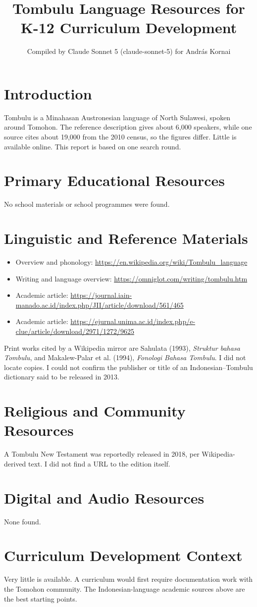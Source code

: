 \documentclass[12pt]{article}
\title{Tombulu Language Resources for K-12 Curriculum Development}
\author{Compiled by Claude Sonnet 5 (claude-sonnet-5) for Andr\'as Kornai}
\date{}
\begin{document}
\maketitle

\section{Introduction}
Tombulu is a Minahasan Austronesian language of North Sulawesi, spoken around Tomohon. The reference description gives about 6,000 speakers, while one source cites about 19,000 from the 2010 census, so the figures differ. Little is available online. This report is based on one search round.

\section{Primary Educational Resources}
No school materials or school programmes were found.

\section{Linguistic and Reference Materials}
\begin{itemize}
\item Overview and phonology: \url{https://en.wikipedia.org/wiki/Tombulu_language}
\item Writing and language overview: \url{https://omniglot.com/writing/tombulu.htm}
\item Academic article: \url{https://journal.iain-manado.ac.id/index.php/JII/article/download/561/465}
\item Academic article: \url{https://ejurnal.unima.ac.id/index.php/e-clue/article/download/2971/1272/9625}
\end{itemize}
Print works cited by a Wikipedia mirror are Sahulata (1993), \emph{Struktur bahasa Tombulu}, and Makalew-Palar et al. (1994), \emph{Fonologi Bahasa Tombulu}. I did not locate copies. I could not confirm the publisher or title of an Indonesian--Tombulu dictionary said to be released in 2013.

\section{Religious and Community Resources}
A Tombulu New Testament was reportedly released in 2018, per Wikipedia-derived text. I did not find a URL to the edition itself.

\section{Digital and Audio Resources}
None found.

\section{Curriculum Development Context}
Very little is available. A curriculum would first require documentation work with the Tomohon community. The Indonesian-language academic sources above are the best starting points.
\end{document}
